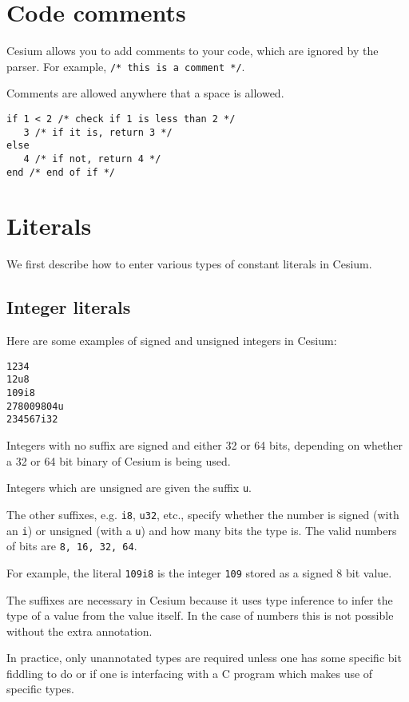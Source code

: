 \documentclass[a4paper,10pt]{article}
\newcommand{\code}{\lstinline}
\begin{document}
\section{Code comments}

Cesium allows you to add comments to your code, which are ignored by the parser. For example, 
\code{/* this is a comment */}.

Comments are allowed anywhere that a space is allowed.

\begin{lstlisting}
if 1 < 2 /* check if 1 is less than 2 */
   3 /* if it is, return 3 */
else
   4 /* if not, return 4 */
end /* end of if */
\end{lstlisting}

\section{Literals}

We first describe how to enter various types of constant literals in Cesium.  

\subsection{Integer literals}

Here are some examples of signed and unsigned integers in Cesium:

\begin{lstlisting}
1234
12u8
109i8
278009804u
234567i32
\end{lstlisting}

Integers with no suffix are signed and either 32 or 64 bits, depending on whether a 32 or 
64 bit binary of Cesium is being used.

Integers which are unsigned are given the suffix \code{u}. 

The other suffixes, e.g. \code{i8}, \code{u32}, etc., specify whether the number is signed
(with an \code{i}) or unsigned (with a \code{u}) and how many bits the type is. The valid 
numbers of bits are \code{8, 16, 32, 64}.

For example, the literal \code{109i8} is the integer \code{109} stored as a signed 8 bit 
value.

The suffixes are necessary in Cesium because it uses type inference to infer the type of a
value from the value itself. In the case of numbers this is not possible without the extra 
annotation. 

In practice, only unannotated types are required unless one has some specific bit fiddling 
to do or if one is interfacing with a C program which makes use of specific types.
\end{document}
